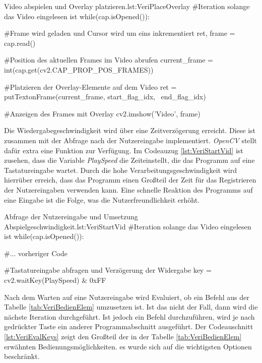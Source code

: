 \begin{pythoncode}{Video abspielen und Overlay platzieren.}{lst:VeriPlaceOverlay}
#Iteration solange das Video eingelesen ist
while(cap.isOpened()):

    #Frame wird geladen und Cursor wird um eins inkrementiert
    ret, frame = cap.read()

    #Position des aktuellen Frames im Video abrufen
    current_frame = int(cap.get(cv2.CAP_PROP_POS_FRAMES))

    #Platzieren der Overlay-Elemente auf dem Video 
    ret = putTextonFrame(current_frame, start_flag_idx, \ 
            end_flag_idx)
    
    #Anzeigen des Frames mit Overlay
    cv2.imshow('Video', frame)

\end{pythoncode}

Die Wiedergabegeschwindigkeit wird über eine Zeitverzögerung erreicht. Diese ist zusammen mit der Abfrage nach der Nutzereingabe implementiert. \textit{OpenCV} stellt dafür extra eine Funktion zur Verfügung. Im Codeauzug \ref{lst:VeriStartVid} ist zusehen, dass die Variable \textit{PlaySpeed} die Zeiteinstellt, die das Programm auf eine Tastatureingabe wartet. Durch die hohe Verarbeitungsgeschwindigkeit wird hierrüber erreich, dass das Programm einen Großteil der Zeit für das Registrieren der Nutzereingaben verwenden kann. Eine schnelle Reaktion des Programms auf eine Eingabe ist die Folge, was die Nutzerfreundlichkeit erhöht.

\begin{pythoncode}{Abfrage der Nutzereingabe und Umsetzung Abspielgeschwindigkeit.}{lst:VeriStartVid}
#Iteration solange das Video eingelesen ist
while(cap.isOpened()):

     #... vorheriger Code

    #Tastatureingabe abfragen und Verzögerung der Widergabe 
    key = cv2.waitKey(PlaySpeed) & 0xFF

\end{pythoncode}

Nach dem Warten auf eine Nutzereingabe wird Evaluiert, ob ein Befehl aus der Tabelle \ref{tab:VeriBedienElem} umzusetzen ist. Ist das nicht der Fall, dann wird die nächste Iteration durchgeführt. Ist jedoch ein Befehl durchzuführen, wird je nach gedrückter Taste ein anderer Programmabschnitt ausgeführt. Der Codeauschnitt \ref{lst:VeriEvalKeys} zeigt den Großteil der in der Tabelle \ref{tab:VeriBedienElem} erwähnten Bedienungsmöglichkeiten. es wurde sich auf die wichtigsten Optionen beschränkt. \par

